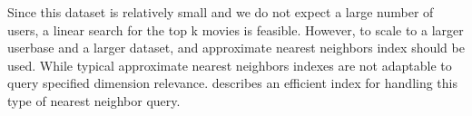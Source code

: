Since this dataset is relatively small and we do not expect a large number of users, a linear search for the top k movies is feasible.  However, to scale to a larger userbase and a larger dataset, and approximate nearest neighbors index should be used.  While typical approximate nearest neighbors indexes are not adaptable to query specified dimension relevance.  \cite{davethesis} describes an efficient index for handling this type of nearest neighbor query.